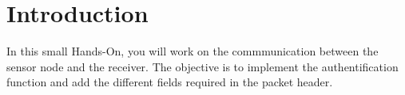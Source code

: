\section*{Introduction}

In this small Hands-On, you will work on the commmunication between the sensor node
and the receiver. The objective is to implement the authentification function and add the different fields required in the packet header.
